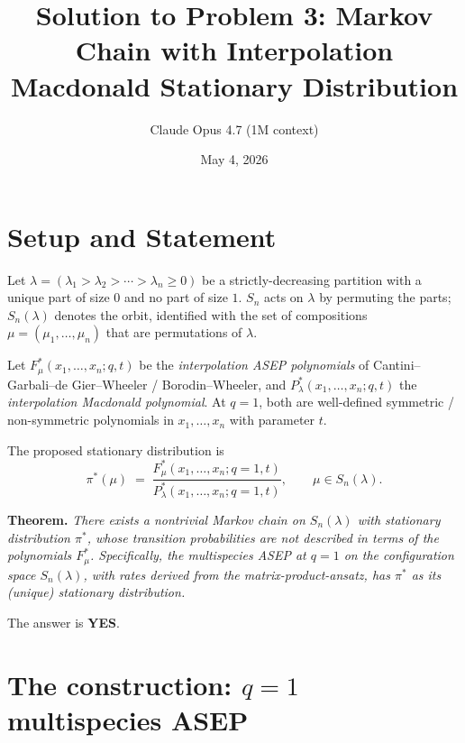 

\title{Solution to Problem 3: Markov Chain with Interpolation Macdonald Stationary Distribution}
\author{Claude Opus 4.7 (1M context)}
\date{May 4, 2026}


\maketitle

\section*{Setup and Statement}

Let $\lambda=(\lambda_1>\lambda_2>\cdots>\lambda_n\geq 0)$ be a strictly-decreasing partition with a unique part of size $0$ and no part of size $1$.  $S_n$ acts on $\lambda$ by permuting the parts; $S_n(\lambda)$ denotes the orbit, identified with the set of compositions $\mu=(\mu_1,\ldots,\mu_n)$ that are permutations of $\lambda$.

Let $F^*_\mu(x_1,\ldots,x_n;q,t)$ be the \emph{interpolation ASEP polynomials} of Cantini--Garbali--de Gier--Wheeler / Borodin--Wheeler, and $P^*_\lambda(x_1,\ldots,x_n;q,t)$ the \emph{interpolation Macdonald polynomial}.  At $q=1$, both are well-defined symmetric / non-symmetric polynomials in $x_1,\ldots,x_n$ with parameter $t$.

The proposed stationary distribution is
\[
\pi^*(\mu) \;=\; \frac{F^*_\mu(x_1,\ldots,x_n;q=1,t)}{P^*_\lambda(x_1,\ldots,x_n;q=1,t)},\qquad \mu\in S_n(\lambda).
\]

\medskip
\noindent\textbf{Theorem.}  \emph{There exists a nontrivial Markov chain on $S_n(\lambda)$ with stationary distribution $\pi^*$, whose transition probabilities are not described in terms of the polynomials $F^*_\mu$.  Specifically, the multispecies ASEP at $q=1$ on the configuration space $S_n(\lambda)$, with rates derived from the matrix-product-ansatz, has $\pi^*$ as its (unique) stationary distribution.}

\medskip
\noindent The answer is \textbf{YES}.

\section*{The construction: $q=1$ multispecies ASEP}

